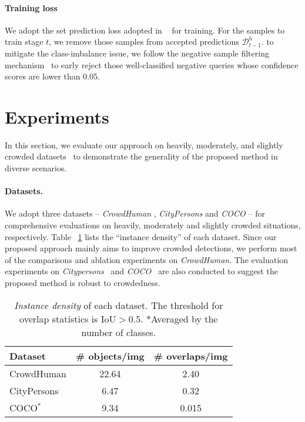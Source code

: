 \documentclass[final]{cvpr}
\begin{document}
\vspace{-0.6cm} 
\paragraph{Training loss}

We adopt the set prediction
loss adopted in ~\cite{sun2020sparse,zhu2021deformable} for training. For the samples to train stage $t$, we remove those samples from accepted predictions $\mathcal{D}^h_{t-1}$. to mitigate the class-imbalance issue, we follow the negative sample filtering mechanism~\cite{zhang2018refinedet} to early reject those well-classified negative queries whose confidence scores are lower than 0.05.


\vspace{-0.3cm}
\section{Experiments}
\label{sec:exp}
In this section, we evaluate our approach on heavily, moderately, and slightly crowded datasets~\cite{shao2018crowdhuman,zhang2017citypersons,lin2014microsoft} to demonstrate the generality of the proposed method in diverse scenarios.
\vspace{-0.6cm} 
\paragraph{Datasets.}

We adopt three datasets -- \emph{CrowdHuman} \cite{shao2018crowdhuman}, \emph{CityPersons} \cite{zhang2017citypersons} and \emph{COCO} \cite{lin2014microsoft} -- for comprehensive evaluations on heavily, moderately and slightly crowded situations, respectively. Table ~\ref{tbl:datasets} lists the ``instance density'' of each dataset.  Since our proposed approach mainly aims to improve crowded detections, we perform most of the comparisons and ablation experiments on \emph{CrowdHuman}. The evaluation experiments on \emph{Citypersons}~\cite{zhang2017citypersons} and \emph{COCO}~\cite{lin2014microsoft} are also conducted to suggest the proposed method is robust to crowdedness.

\begin{table}[t]
  \centering
  \begin{tabular}{l|c|c}
      \toprule
      Dataset & \# objects/img & \# overlaps/img  \\
      \hline
      CrowdHuman \cite{shao2018crowdhuman} & 22.64  & 2.40 \\
      CityPersons \cite{zhang2017citypersons} & 6.47  & 0.32 \\
      COCO$^*$ \cite{lin2014microsoft} & 9.34  & 0.015 \\
      \bottomrule
  \end{tabular}
  \vspace{-2pt}
  \caption{\emph{Instance density} of each dataset.  The threshold for overlap statistics is $\mathrm{IoU} > 0.5$.  *Averaged by the number of classes.}
  \label{tbl:datasets}
\vspace{-1.pc}
\end{table} 
\end{document}
